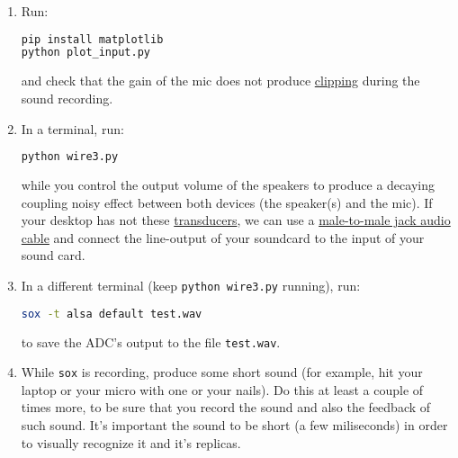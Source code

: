 \begin{enumerate}
\begin{enumerate}
  \begin{lstlisting}[language=Bash]
sudo apt install sox
sudo apt install audacity
sudo apt install curl
curl https://raw.githubusercontent.com/Tecnologias-multimedia/intercom/master/test/sounddevice/plot_input.py > plot_input.py
  \end{lstlisting}

  \item Run:
    
    \begin{lstlisting}[language=Bash]
pip install matplotlib
python plot_input.py
    \end{lstlisting}

    and check that the gain of the mic does not
    produce \href{https://en.wikipedia.org/wiki/Clipping_(audio)}{clipping}
    during the sound recording.

  \item \label{start_point} In a terminal, run:

    \begin{lstlisting}[language=Bash]
python wire3.py
    \end{lstlisting}

    while you control the output volume of the speakers to produce a
    decaying coupling noisy effect between both devices (the
    speaker(s) and the mic). If your desktop has not these
    \href{https://en.wikipedia.org/wiki/Transducer}{transducers}, we
    can use a
    \href{https://www.google.com/search?q=male+to+male+audio+jack+cable&client=firefox-b-d&sxsrf=ALeKk00GZUDGqiOfc0D8xkA_MIYgCuZmSA:1600270049146&source=lnms&tbm=isch&sa=X&ved=2ahUKEwjdvsu-_u3rAhXl0eAKHS90DUoQ_AUoAXoECA0QAw&biw=4288&bih=972}{male-to-male
      jack audio cable} and connect the line-output of your soundcard
    to the input of your sound card.

  \item In a different terminal (keep \texttt{python wire3.py}
    running), run:

    \begin{lstlisting}[language=Bash]
sox -t alsa default test.wav
    \end{lstlisting}

    to save the ADC's output to the file \texttt{test.wav}.

  \item While \texttt{sox} is recording, produce some short sound (for
    example, hit your laptop or your micro with one or your nails). Do
    this at least a couple of times more, to be sure that you record
    the sound and also the feedback of such sound. It's important the
    sound to be short (a few miliseconds) in order to visually
    recognize it and it's replicas.


\end{enumerate}
\end{enumerate}
